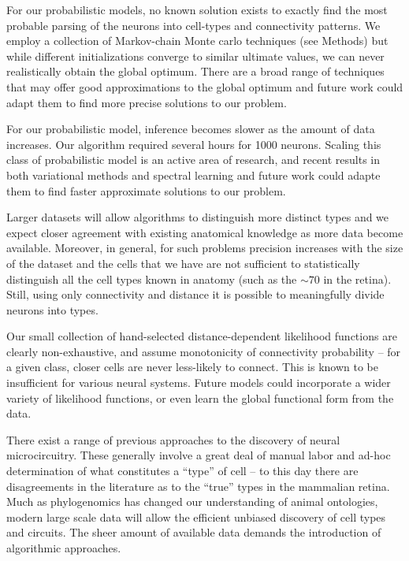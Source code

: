 \documentclass{article}
\begin{document}
For our probabilistic models, no known solution exists to
exactly find the most probable parsing of the neurons into cell-types
and connectivity patterns. We employ a collection of Markov-chain
Monte carlo techniques (see Methods) but while different
initializations converge to similar ultimate values, we can never
realistically obtain the global optimum. There are a broad range of
techniques that may offer good approximations to the global optimum
and future work could adapt them to
find more precise solutions to our problem.

For our probabilistic model, inference becomes slower as the amount of
data increases. Our algorithm required several hours for 1000
neurons. Scaling this class of probabilistic model is an active area
of research, and recent results in both variational methods
\autocite{Hoffman2013} and spectral learning \autocite{Anandkumar2012}
and future work could adapte them to find faster approximate solutions
to our problem.

Larger datasets will allow algorithms to distinguish more distinct
types and we expect closer agreement with existing anatomical
knowledge as more data become available.  Moreover, in general, for
such problems precision increases with the size of the dataset and the
cells that we have are not sufficient to statistically distinguish all
the cell types known in anatomy (such as the $\sim 70$ in the
retina). Still, using only connectivity and distance it is possible to
meaningfully divide neurons into types.

Our small collection of hand-selected distance-dependent likelihood
functions are clearly non-exhaustive, and assume monotonicity
of connectivity probability -- for a given class, closer cells
are never less-likely to connect. This is known to be insufficient
for various neural systems. Future models could incorporate
a wider variety of likelihood functions, or even learn the global
functional form from the data. 

There exist a range of previous approaches to the discovery of neural
microcircuitry\autocite{Mountcastle1957, Douglas1991, Bartho2004,
  Freund1998}.  These generally involve a great deal of manual labor
and ad-hoc determination of what constitutes a “type” of cell -- to
this day there are disagreements in the literature as to the “true”
types in the mammalian retina. Much as phylogenomics has changed our
understanding of animal ontologies, modern large scale data will allow
the efficient unbiased discovery of cell types and circuits. The sheer
amount of available data demands the introduction of algorithmic
approaches.
\end{document}
